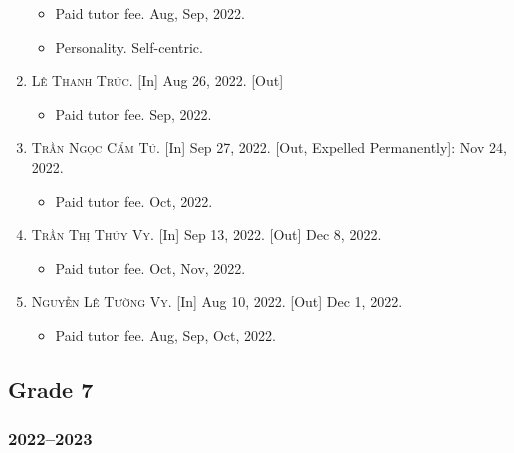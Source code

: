 \documentclass{article}
\begin{document}
\begin{enumerate}
	\begin{itemize}
		\item \textsf{Paid tutor fee.} Aug, Sep, 2022.
		\item \textsf{Personality.} Self-centric.
	\end{itemize}
	\item \textsc{Lê Thanh Trúc.} \textsf{[In]} Aug 26, 2022. \textsf{[Out]}
	\begin{itemize}
		\item \textsf{Paid tutor fee.} Sep, 2022.
	\end{itemize}
	\item \textsc{Trần Ngọc Cẩm Tú.} \textsf{[In]} Sep 27, 2022. \textsf{[Out, Expelled Permanently]}: Nov 24, 2022.
	\begin{itemize}
		\item \textsf{Paid tutor fee.} Oct, 2022.
	\end{itemize}
	\item \textsc{Trần Thị Thúy Vy.} \textsf{[In]} Sep 13, 2022. \textsf{[Out]} Dec 8, 2022.
	\begin{itemize}
		\item \textsf{Paid tutor fee.} Oct, Nov, 2022.
	\end{itemize}
	\item \textsc{Nguyễn Lê Tường Vy.} \textsf{[In]} Aug 10, 2022. \textsf{[Out]} Dec 1, 2022.
	\begin{itemize}
		\item \textsf{Paid tutor fee.} Aug, Sep, Oct, 2022.
	\end{itemize}
\end{enumerate}

\subsection{Grade 7}

\subsubsection{2022--2023}
\end{document}
